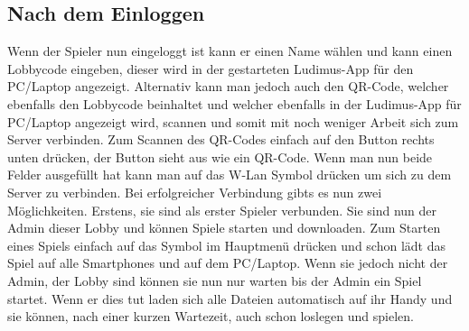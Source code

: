 \subsection{Nach dem Einloggen}
Wenn der Spieler nun eingeloggt ist kann er einen Name wählen und kann einen Lobbycode eingeben, dieser wird in der gestarteten Ludimus-App für den PC/Laptop angezeigt. Alternativ kann man jedoch auch den QR-Code, welcher ebenfalls den Lobbycode beinhaltet und welcher ebenfalls in der Ludimus-App für PC/Laptop angezeigt wird, scannen und somit mit noch weniger Arbeit sich zum Server verbinden. Zum Scannen des QR-Codes einfach auf den Button rechts unten drücken, der Button sieht aus wie ein QR-Code. Wenn man nun beide Felder ausgefüllt hat kann man auf das W-Lan Symbol drücken um sich zu dem Server zu verbinden. Bei erfolgreicher Verbindung gibts es nun zwei Möglichkeiten. Erstens, sie sind als erster Spieler verbunden. Sie sind nun der Admin dieser Lobby und können Spiele starten und downloaden. Zum Starten eines Spiels einfach auf das Symbol im Hauptmenü drücken und schon lädt das Spiel auf alle Smartphones und auf dem PC/Laptop. Wenn sie jedoch nicht der Admin, der Lobby sind können sie nun nur warten bis der Admin ein Spiel startet. Wenn er dies tut laden sich alle Dateien automatisch auf ihr Handy und sie können, nach einer kurzen Wartezeit, auch schon loslegen und spielen.